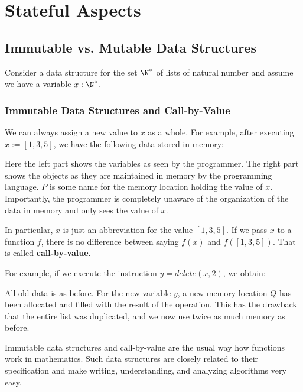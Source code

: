 \section{Stateful Aspects}

\subsection{Immutable vs. Mutable Data Structures}

Consider a data structure for the set $\N^*$ of lists of natural number and assume we have a variable $x:\N^*$.

\subsubsection{Immutable Data Structures and Call-by-Value}

We can always assign a new value to $x$ as a whole.
For example, after executing $x:=[1,3,5]$, we have the following data stored in memory:
\begin{amemory}
\alocations
{}
\end{amemory}
Here the left part shows the variables as seen by the programmer.
The right part shows the objects as they are maintained in memory by the programming language.
$P$ is some name for the memory location holding the value of $x$.
Importantly, the programmer is completely unaware of the organization of the data in memory and only sees the value of $x$.

In particular, $x$ is just an abbreviation for the value $[1,3,5]$.
If we pass $x$ to a function $f$, there is no difference between saying $f(x)$ and $f([1,3,5])$.
That is called \textbf{call-by-value}.

For example, if we execute the instruction $y = delete(x,2)$, we obtain:
\begin{amemory}
\alocations
{}
\end{amemory}
All old data is as before.
For the new variable $y$, a new memory location $Q$ has been allocated and filled with the result of the operation.
This has the drawback that the entire list was duplicated, and we now use twice as much memory as before.

Immutable data structures and call-by-value are the usual way how functions work in mathematics.
Such data structures are closely related to their specification and make writing, understanding, and analyzing algorithms very easy.

